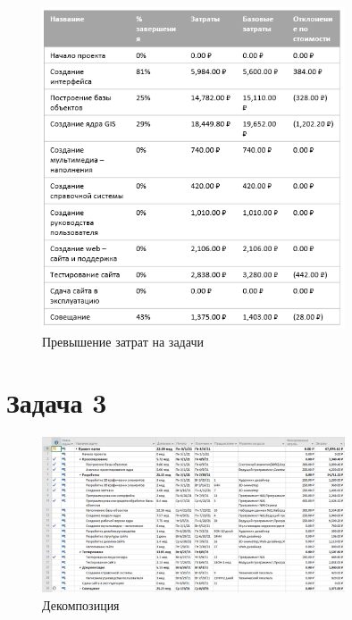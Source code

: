 \begin{figure}[H]
    \centering
    \includegraphics[width=0.8\textwidth]{img/content/task_02_2.png}
    \caption{Превышение затрат на задачи}
    \label{fig:task_02_2}
\end{figure}

\section{Задача 3}

\begin{figure}[H]
    \centering
    \includegraphics[width=0.8\textwidth]{img/content/task_03.png}
    \caption{Декомпозиция}
    \label{fig:task_03}
\end{figure}
